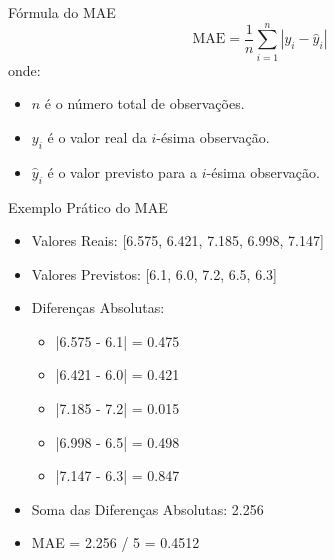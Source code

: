 \documentclass[handout,aspectratio = 169]{beamer}
\begin{document}
\begin{frame}{Fórmula do MAE}
\begin{equation}
\text{MAE} = \frac{1}{n} \sum_{i=1}^{n} |y_i - \hat{y}_i|
\end{equation}
onde:
\begin{itemize}
    \item \( n \) é o número total de observações.
    \item \( y_i \) é o valor real da \( i \)-ésima observação.
    \item \( \hat{y}_i \) é o valor previsto para a \( i \)-ésima observação.
\end{itemize}
\end{frame}

\begin{frame}{Exemplo Prático do MAE}
\begin{itemize}
    \item Valores Reais: [6.575, 6.421, 7.185, 6.998, 7.147]
    \item Valores Previstos: [6.1, 6.0, 7.2, 6.5, 6.3]
    \item Diferenças Absolutas:
    \begin{itemize}
        \item |6.575 - 6.1| = 0.475
        \item |6.421 - 6.0| = 0.421
        \item |7.185 - 7.2| = 0.015
        \item |6.998 - 6.5| = 0.498
        \item |7.147 - 6.3| = 0.847
    \end{itemize}
    \item Soma das Diferenças Absolutas: 2.256
    \item MAE = 2.256 / 5 = 0.4512
\end{itemize}
\end{frame}


\end{document}
